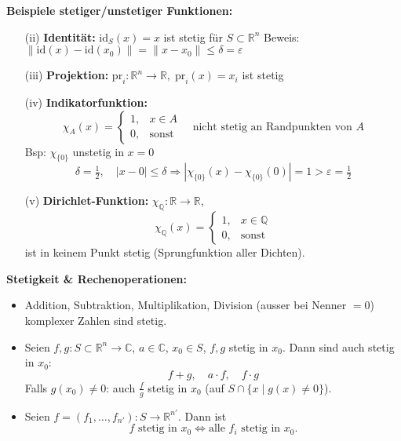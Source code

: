 \textbf{Beispiele stetiger/unstetiger Funktionen:}
\begin{itemize}
  \item[(ii)] \textbf{Identität:} $\mathrm{id}_S(x) = x$ ist stetig für $S \subset \mathbb{R}^n$  
  Beweis: $\|\mathrm{id}(x) - \mathrm{id}(x_0)\| = \|x - x_0\| \leq \delta = \varepsilon$

  \item[(iii)] \textbf{Projektion:} $\mathrm{pr}_i : \mathbb{R}^n \to \mathbb{R},\; \mathrm{pr}_i(x) = x_i$ ist stetig

  \item[(iv)] \textbf{Indikatorfunktion:}  
    \[
      \chi_A(x) = \begin{cases}
        1, & x \in A \\
        0, & \text{sonst}
      \end{cases}
    \quad\text{nicht stetig an Randpunkten von } A
    \]
    Bsp: $\chi_{\{0\}}$ unstetig in $x = 0$  
    \[
      \delta = \tfrac{1}{2},\quad |x - 0| \leq \delta \Rightarrow
      |\chi_{\{0\}}(x) - \chi_{\{0\}}(0)| = 1 > \varepsilon = \tfrac{1}{2}
    \]

  \item[(v)] \textbf{Dirichlet-Funktion:} $\chi_{\mathbb{Q}}:\mathbb{R} \to \mathbb{R}$,  
    \[
      \chi_{\mathbb{Q}}(x) = \begin{cases}
        1, & x \in \mathbb{Q} \\
        0, & \text{sonst}
      \end{cases}
    \]
    ist in keinem Punkt stetig (Sprungfunktion aller Dichten).
\end{itemize}

\textbf{Stetigkeit \& Rechenoperationen:}
\begin{itemize}
  \item Addition, Subtraktion, Multiplikation, Division (ausser bei Nenner \(=0\)) komplexer Zahlen sind stetig.

  \item Seien \(f,g : S \subset \mathbb{R}^n \to \mathbb{C}\), \(a \in \mathbb{C}\), \(x_0 \in S\), \(f,g\) stetig in \(x_0\). Dann sind auch stetig in \(x_0\):  
  \[
  f + g,\quad a \cdot f,\quad f \cdot g
  \]
  Falls \(g(x_0) \ne 0\): auch \(\frac{f}{g}\) stetig in \(x_0\) (auf \(S \cap \{x \mid g(x) \ne 0\}\)).

  \item Seien \(f = (f_1, \dots, f_{n'}) : S \to \mathbb{R}^{n'}\). Dann ist  
  \[
  f \text{ stetig in } x_0 \iff \text{alle } f_i \text{ stetig in } x_0.
  \]
\end{itemize}

